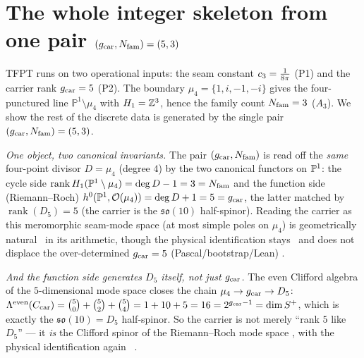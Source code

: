 \section{The whole integer skeleton from one pair $(g_{\mathrm{car}},N_{\mathrm{fam}})=(5,3)$}\label{sec:core}
TFPT runs on two operational inputs: the seam constant $c_3=\tfrac1{8\pi}$ (P1) and the carrier rank
$g_{\mathrm{car}}=5$ (P2). The boundary $\mu_4=\{1,i,-1,-i\}$ gives the four-punctured line $\mathbb P^1\setminus\mu_4$
with $H_1=\mathbb Z^3$, hence the family count $N_{\mathrm{fam}}=3$ ($A_3$). We show the rest of the discrete data is
generated by the single pair $(g_{\mathrm{car}},N_{\mathrm{fam}})=(5,3)$.
\par\smallskip
\noindent\emph{One object, two canonical invariants.} The pair $(g_{\mathrm{car}},N_{\mathrm{fam}})$ is read off the
\emph{same} four-point divisor $D=\mu_4$ (degree $4$) by the two canonical functors on $\mathbb P^1$: the cycle
side $\operatorname{rank}H_1(\mathbb P^1\setminus\mu_4)=\deg D-1=3=N_{\mathrm{fam}}$ and the function side (Riemann--Roch)
$h^0(\mathbb P^1,\mathcal O(\mu_4))=\deg D+1=5=g_{\mathrm{car}}$, the latter matched by $\operatorname{rank}(D_5)=5$ (the
carrier is the $\mathfrak{so}(10)$ half-spinor). Reading the carrier as this meromorphic seam-mode space
(at most simple poles on $\mu_4$) is geometrically natural \mE\ in its arithmetic, though the physical
identification stays \mC\ and does not displace the over-determined $g_{\mathrm{car}}=5$ (Pascal/bootstrap/Lean)
.
\par\smallskip
\noindent\emph{And the function side generates $D_5$ itself, not just $g_{\mathrm{car}}$.} The even Clifford algebra of
the $5$-dimensional mode space closes the chain $\mu_4\to g_{\mathrm{car}}\to D_5$: $\Lambda^{\mathrm{even}}(C_{\mathrm{car}})
=\binom50+\binom52+\binom54=1+10+5=16=2^{g_{\mathrm{car}}-1}=\dim S^+$, which is exactly the $\mathfrak{so}(10)=D_5$
half-spinor. So the carrier is not merely ``rank $5$ like $D_5$'' --- it \emph{is} the Clifford spinor of the
Riemann--Roch mode space \mE, with the physical identification again \mC\ .

